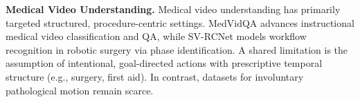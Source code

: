 \documentclass{article}
\theoremstyle{plain}
\theoremstyle{definition}
\theoremstyle{remark}
\begin{document}





\textbf{Medical Video Understanding.} Medical video understanding has primarily targeted structured, procedure-centric settings. MedVidQA \cite{Gupta2023MedVidQA} advances instructional medical video classification and QA, while SV-RCNet \cite{jin2018svrcnet} models workflow recognition in robotic surgery via phase identification. A shared limitation is the assumption of intentional, goal-directed actions with prescriptive temporal structure (e.g., surgery, first aid). In contrast, datasets for involuntary pathological motion remain scarce.
\end{document}
